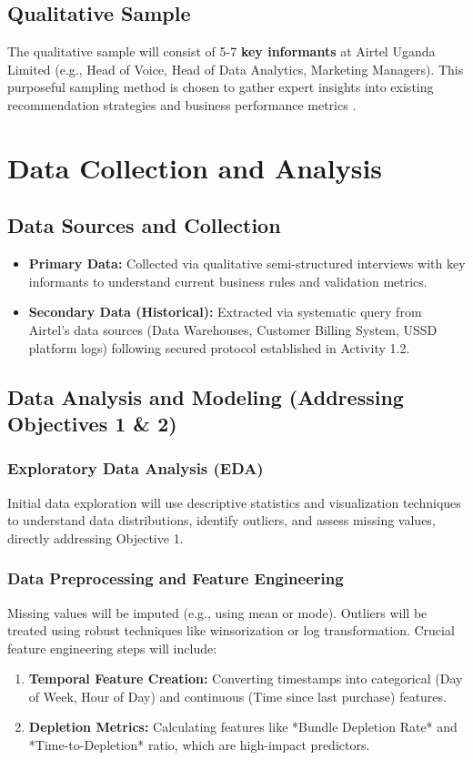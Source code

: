 \documentclass[12pt, a4paper]{report}
\begin{document}
\subsection{Qualitative Sample}
The qualitative sample will consist of 5-7 \textbf{key informants} at Airtel Uganda Limited (e.g., Head of Voice, Head of Data Analytics, Marketing Managers). This purposeful sampling method is chosen to gather expert insights into existing recommendation strategies and business performance metrics \citep{turner2010qualitative}.

\section{Data Collection and Analysis}

\subsection{Data Sources and Collection}
\begin{itemize}
    \item \textbf{Primary Data:} Collected via qualitative semi-structured interviews with key informants to understand current business rules and validation metrics.
    \item \textbf{Secondary Data (Historical):} Extracted via systematic query from Airtel's data sources (Data Warehouses, Customer Billing System, USSD platform logs) following secured protocol established in Activity 1.2.
\end{itemize}

\subsection{Data Analysis and Modeling (Addressing Objectives 1 \& 2)}
\subsubsection{Exploratory Data Analysis (EDA)}
Initial data exploration will use descriptive statistics and visualization techniques \citep{tukey1977exploratory} to understand data distributions, identify outliers, and assess missing values, directly addressing Objective 1.

\subsubsection{Data Preprocessing and Feature Engineering}
Missing values will be imputed (e.g., using mean or mode). Outliers will be treated using robust techniques like winsorization or log transformation. Crucial feature engineering steps will include:
\begin{enumerate}
    \item \textbf{Temporal Feature Creation:} Converting timestamps into categorical (Day of Week, Hour of Day) and continuous (Time since last purchase) features.
    \item \textbf{Depletion Metrics:} Calculating features like *Bundle Depletion Rate* and *Time-to-Depletion* ratio, which are high-impact predictors.
\end{enumerate}
\end{document}
